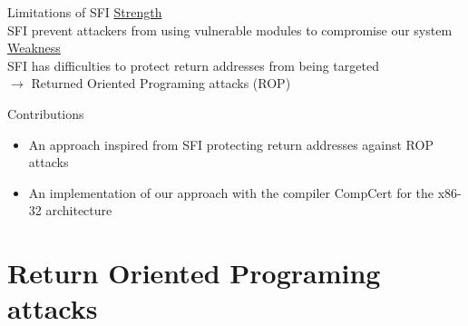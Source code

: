 \documentclass{beamer}
\begin{document}
\begin{frame}[c]{Limitations of SFI}
	\underline{Strength}\\
	SFI prevent attackers from using vulnerable modules to compromise our system\\
	\hfill \break
	\hfill \break
	\underline{Weakness}\\
	SFI has difficulties to protect return addresses from being targeted \\
	$\rightarrow$ Returned Oriented Programing attacks (ROP) 
\end{frame}

\begin{frame}[c]{Contributions}
\begin{itemize}\itemsep20pt
		\item An approach inspired from SFI protecting return addresses against ROP attacks
		\item An implementation of our approach with the compiler CompCert for the x86-32 architecture
	\end{itemize}
\end{frame}

\section{Return Oriented Programing attacks}
\label{sec:Return Oriented Programing attacks}
\end{document}
